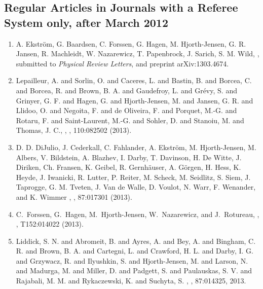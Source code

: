 \documentclass[prc,amsart,english,twocolumn,superscriptaddress,showpacs,floatfix]{revtex4}
\begin{document}
 \subsection*{Regular Articles in Journals with a Referee System only, after March 2012}
 \begin{enumerate}

 \item
A. Ekstr\"om, G. Baardsen, C. Forssen, G. Hagen, M. Hjorth-Jensen, G. R. Jansen, R. Machleidt, W. Nazarewicz, T. Papenbrock, J. Sarich, S. M. Wild, 
 , 
 \newblock submitted to {\em Physical Review Letters},  and preprint arXiv:1303.4674.

 \item Lepailleur, A. and Sorlin, O. and Caceres, L. and Bastin, B. and Borcea, C. and Borcea, R. and Brown, B. A. and Gaudefroy, L. and Gr\'evy, S. and Grinyer, G. F. and Hagen, G. and Hjorth-Jensen, M. and Jansen, G. R. and Llidoo, O. and Negoita, F. and de Oliveira, F. and Porquet, M.-G. and Rotaru, F. and Saint-Laurent, M.-G. and Sohler, D. and Stanoiu, M. and Thomas, J. C.,
 , 
 ,  110:082502 (2013).

 \item D. D. DiJulio, J. Cederkall, C. Fahlander, A. Ekstr\"om, M. Hjorth-Jensen, M. Albers, V. Bildstein, A. Blazhev, I. Darby, T. Davinson, H. De Witte, J. Diriken, Ch. Fransen, K. Geibel, R. Gernhäuser, A. Görgen, H. Hess, K. Heyde, J. Iwanicki, R. Lutter, P. Reiter, M. Scheck, M. Seidlitz, S. Siem, J. Taprogge, G. M. Tveten, J. Van de Walle, D. Voulot, N. Warr, F. Wenander, and K. Wimmer
 , 
 ,  87:017301 (2013).


 \item  C.~Forssen, G.~Hagen, M.~Hjorth-Jensen, W.~Nazarewicz, and J.~Rotureau,
 , 
 ,  T152:014022 (2013).

 \item Liddick, S. N. and Abromeit, B. and Ayres, A. and Bey, A. and Bingham, C. R. and Brown, B. A. and Cartegni, L. and Crawford, H. L. and Darby, I. G. and Grzywacz, R. and Ilyushkin, S. and Hjorth-Jensen, M. and Larson, N. and Madurga, M. and Miller, D. and Padgett, S. and Paulauskas, S. V. and Rajabali, M. M. and Rykaczewski, K. and Suchyta, S.
 , 
 ,  87:014325, 2013.



\end{enumerate}
\end{document}
